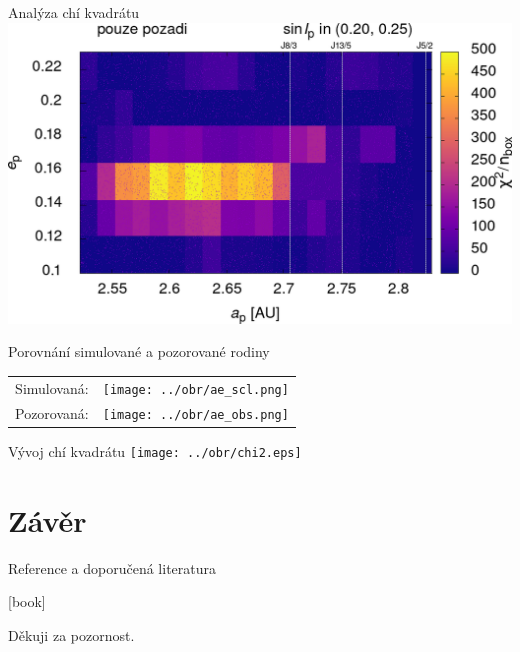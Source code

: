 \documentclass[xcolor=dvipsnames]{beamer}
\begin{document}
\begin{frame}[t]{\secname}{Analýza chí kvadrátu}
\includegraphics[width=0.41\paperwidth]{../obr/ae_chi_emptyt.png}
\end{frame}

\begin{frame}[t]{\secname}{Porovnání simulované a pozorované rodiny}
\begin{tabularx}{\textwidth}{c V}
\centering
Simulovaná: & \texttt{[image: ../obr/ae\_scl.png]}\\
Pozorovaná: & \texttt{[image: ../obr/ae\_obs.png]}
\end{tabularx}
\end{frame}

\begin{frame}[c]{\secname}{Vývoj chí kvadrátu}
\centering
\texttt{[image: ../obr/chi2.eps]}
\end{frame}

\section{Závěr}
\begin{frame}[t]{\secname}{Reference a doporučená literatura}
	\printbibliography

{\color{blue}
	\hdashrule[0.5ex]{\textwidth}{0.7pt}{2mm}}

	\newrefsection{}
	[book]
	\nocite{fmt}
	\nocite{murray00}
	\nocite{brozphd}
	\printbibliography
\end{frame}
\begin{frame}
Děkuji za pozornost.
\end{frame}
\end{document}

